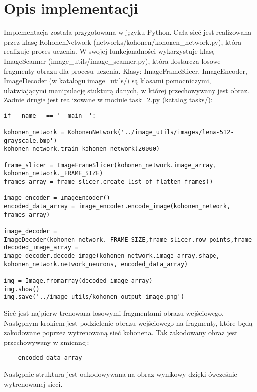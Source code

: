 \documentclass{classrep}
\begin{document}
\section{Opis implementacji}
{Implementacja została przygotowana w języku Python. Cała sieć jest realizowana przez klasę KohonenNetwork (networks\slash kohonen\slash kohonen{\_}network.py), która realizuje proces uczenia. W swojej funkcjonalności wykorzystuje klasę ImageScanner (image{\_}utils\slash image{\_}scanner.py), która dostarcza losowe fragmenty obrazu dla procesu uczenia. Klasy: ImageFrameSlicer, ImageEncoder, ImageDecoder (w katalogu image{\_}utils\slash) są klasami pomocniczymi, ułatwiającymi manipulację stukturą danych, w której przechowywany jest obraz. Zadnie drugie jest realizowane w module task{\_}2.py (katalog tasks\slash): 
\begin{lstlisting}
if __name__ == '__main__':

kohonen_network = KohonenNetwork('../image_utils/images/lena-512-grayscale.bmp')
kohonen_network.train_kohonen_network(20000)

frame_slicer = ImageFrameSlicer(kohonen_network.image_array, kohonen_network._FRAME_SIZE)
frames_array = frame_slicer.create_list_of_flatten_frames()

image_encoder = ImageEncoder()
encoded_data_array = image_encoder.encode_image(kohonen_network, frames_array)

image_decoder = ImageDecoder(kohonen_network._FRAME_SIZE,frame_slicer.row_points,frame_slicer.column_points)
decoded_image_array = image_decoder.decode_image(kohonen_network.image_array.shape, kohonen_network.network_neurons, encoded_data_array)

img = Image.fromarray(decoded_image_array)
img.show()
img.save('../image_utils/kohonen_output_image.png')
\end{lstlisting}
Sieć jest najpierw trenowana losowymi fragmentami obrazu wejściowego. Następnym krokiem jest podzielenie obrazu wejściowego na fragmenty, które będą zakodowane poprzez wytrenowaną sieć kohonena. Tak zakodowany obraz jest przechowywany w zmiennej: 
\begin{lstlisting}
	encoded_data_array
\end{lstlisting}
Następnie struktura jest odkodowywana na obraz wynikowy dzięki ówcześnie wytrenowanej sieci.
}
\end{document}
